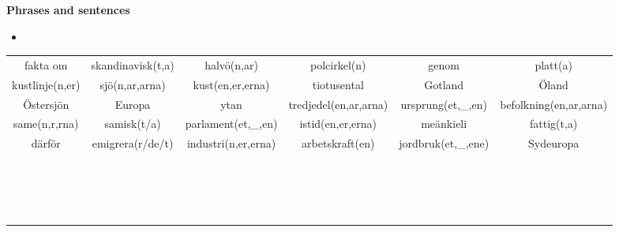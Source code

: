 
\begin{flushleft}
    \textbf{Phrases and sentences}
    \begin{itemize}
        \item 
    \end{itemize}
\end{flushleft}

\begin{center}
    \begin{adjustwidth}{-2.5cm}{}
        \begin{tabular}{|c c c c c c|}
            \hline
            fakta om & skandinavisk(t,a) & halvö(n,ar) & polcirkel(n) & genom & platt(a) \\
            kustlinje(n,er) & sjö(n,ar,arna) & kust(en,er,erna) & tiotusental & Gotland & Öland \\
            Östersjön & Europa & ytan & tredjedel(en,ar,arna) & ursprung(et,\_,en) & befolkning(en,ar,arna) \\
            same(n,r,rna) & samisk(t/a) & parlament(et,\_,en) & istid(en,er,erna) & meänkieli & fattig(t,a) \\
            därför & emigrera(r/de/t) & industri(n,er,erna) & arbetskraft(en) & jordbruk(et,\_,ene) & Sydeuropa \\
             &  &  &  &  &  \\
             &  &  &  &  &  \\
             &  &  &  &  &  \\
             &  &  &  &  &  \\
             &  &  &  &  &  \\
             &  &  &  &  &  \\
             &  &  &  &  &  \\
             &  &  &  &  &  \\
             &  &  &  &  &  \\
             &  &  &  &  &  \\
             &  &  &  &  &  \\
             &  &  &  &  &  \\
             &  &  &  &  &  \\
             &  &  &  &  &  \\
             &  &  &  &  &  \\
             &  &  &  &  &  \\
             &  &  &  &  &  \\

\end{tabular}
\end{adjustwidth}
\end{center}
